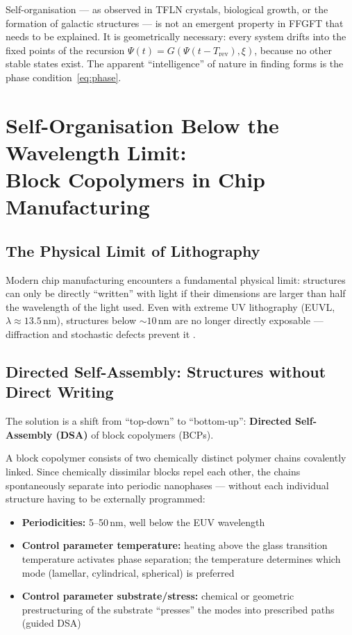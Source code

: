 Self-organisation — as observed in TFLN crystals, biological growth,
or the formation of galactic structures — is not an emergent property
in FFGFT that needs to be explained. It is geometrically necessary:
every system drifts into the fixed points of the recursion
$\Psi(t) = G(\Psi(t-T_\text{rev}), \xi)$, because no other stable
states exist. The apparent ``intelligence'' of nature in finding
forms is the phase condition~\eqref{eq:phase}.

\section{Self-Organisation Below the Wavelength Limit: \\
         Block Copolymers in Chip Manufacturing}

\subsection{The Physical Limit of Lithography}

Modern chip manufacturing encounters a fundamental physical limit:
structures can only be directly ``written'' with light if their
dimensions are larger than half the wavelength of the light used.
Even with extreme UV lithography (EUVL, $\lambda \approx 13.5\,\text{nm}$),
structures below $\sim 10\,\text{nm}$ are no longer directly exposable —
diffraction and stochastic defects prevent it \cite{DSA2026,Lee2025}.

\subsection{Directed Self-Assembly: Structures without Direct Writing}

The solution is a shift from ``top-down'' to ``bottom-up'':
\textbf{Directed Self-Assembly (DSA)} of block copolymers (BCPs).

A block copolymer consists of two chemically distinct polymer chains
covalently linked. Since chemically dissimilar blocks repel each
other, the chains spontaneously separate into periodic nanophases —
without each individual structure having to be externally programmed:

\begin{itemize}
  \item \textbf{Periodicities:} 5--50\,nm, well below the EUV wavelength
  \item \textbf{Control parameter temperature:} heating above the glass
    transition temperature activates phase separation; the temperature
    determines which mode (lamellar, cylindrical, spherical) is preferred
  \item \textbf{Control parameter substrate/stress:} chemical or geometric
    prestructuring of the substrate ``presses'' the modes into prescribed
    paths (guided DSA)
\end{itemize}

